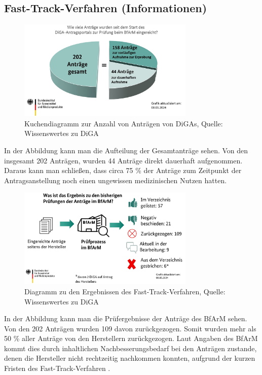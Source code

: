 \documentclass{article}
\begin{document}
		\subsection{Fast-Track-Verfahren (Informationen)} 
			\begin{figure}[htbp]
				\centering
				\includegraphics[width=0.75\textwidth]{./grafiken/Anzahl_Antraege_DiGA}
				\caption[Anzahl Anträge von DiGAs]{Kuchendiagramm zur Anzahl von Anträgen von DiGAs, Quelle: Wissenswertes zu DiGA \cite{wissenswertes-diga}}
				\label{Abb-antragsanzahl-diga}
			\end{figure}
			In der Abbildung kann man die Aufteilung der Gesamtanträge sehen. Von den insgesamt 202 Anträgen, wurden 44 Anträge direkt dauerhaft aufgenommen. Daraus kann man schließen, dass circa 75 \% der Anträge zum Zeitpunkt der Antragsanstellung noch einen ungewissen medizinischen Nutzen hatten.
		
			\begin{figure}[htbp]
				\centering
				\includegraphics[width=0.75\textwidth]{./grafiken/Ergebnis_Pruefungen_DiGA}
				\caption[Abbildung zu den Ergebnissen des Fast-Track-Verfahren]{Diagramm zu den Ergebnissen des Fast-Track-Verfahren, Quelle: Wissenswertes zu DiGA \cite{wissenswertes-diga}}
				\label{Abb-ergebnisse-ft}
			\end{figure} 
			In der Abbildung kann man die Prüfergebnisse der Anträge des BfArM sehen. Von den 202 Anträgen wurden 109 davon zurückgezogen. Somit wurden mehr als 50 \% aller Anträge von den Herstellern zurückgezogen. Laut Angaben des BfArM kommt dies durch inhaltlichen Nachbesserungsbedarf bei den Anträgen zustande, denen die Hersteller nicht rechtzeitig nachkommen konnten, aufgrund der kurzen Fristen des Fast-Track-Verfahren \cite[vgl. Z. 37]{tipps-diga-antragsansteller}. 
			
\end{document}
